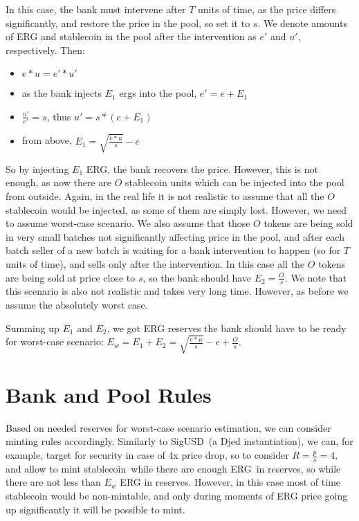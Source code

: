 \documentclass{article}   %
\newcommand{\authnote}[2]{\marginpar{\parbox{\marginparwidth}{\tiny %
  \textsf{#1 {\textcolor{blue}{notes: #2}}}}}%
  \textcolor{blue}{\textbf{\dag}}}
\newcommand{\authnote}[2]{
  \textsf{#1 \textcolor{blue}{: #2}}}
\newcommand{\authnote}[2]{}
\newcommand{\knote}[1]{{\authnote{\textcolor{green}{Alex notes}}{#1}}}
\newcommand{\bc}{ERG}
\newcommand{\sct}{stablecoin}
\begin{document}
In this case, the bank must intervene after $T$ units of time, as the price differs significantly, and restore the price in the pool, so set it to $s$. We denote amounts of \bc{} and \sct{} in the pool after the intervention as $e'$ and $u'$, respectively. Then:

\begin{itemize}
  \item{} $e * u = e' * u'$
  \item{} as the bank injects $E_1$ ergs into the pool, $e' = e + E_1$
  \item{} $\frac{u'}{e'} = s$, thus $u' = s * (e + E_1)$ 
  \item{} from above, $E_1 = \sqrt{\frac{e * u}{s}} - e$
\end{itemize}

So by injecting $E_1$ \bc{}, the bank recovers the price. However, this is not enough, as now there are $O$ \sct{} units which can be injected into the pool from outside. 
Again, in the real life it is not realistic to assume that all the $O$ \sct{} would be injected, as some of them are simply lost. However, we need to assume worst-case scenario. We also assume that those $O$ tokens are being sold in very small batches not significantly affecting price in the pool, and after each batch seller of a new batch is waiting for a bank intervention to happen (so for $T$ units of time), and sells only after the intervention. In this case all the $O$ tokens are being sold at price close to $s$, so the bank should have $E_2 = \frac{O}{s}$. We note that this scenario is also not realistic and takes very long time. However, as before we assume the absolutely worst case.

Summing up $E_1$ and $E_2$, we got \bc{} reserves the bank should have to be ready for worst-case scenario: $E_w = E_1 + E_2 = \sqrt{\frac{e * u}{s}} - e + \frac{O}{s}$.

\knote{Write down reasoning while this scenario is worst-case}

\section{Bank and Pool Rules}

Based on needed reserves for worst-case scenario estimation, we can consider minting rules accordingly. Similarly to SigUSD~(a Djed instantiation), we can, for example, target for security in case of 
4x price drop, so to consider $R = \frac{p}{s} = 4$, and allow to mint \sct{}~while there are enough \bc{}~in reserves, so while there are not less than $E_w$ \bc{} in reserves. However, in this case most of time \sct{} would be non-mintable, and only during moments of \bc{} price going up significantly it will be possible to mint. 
\end{document}
